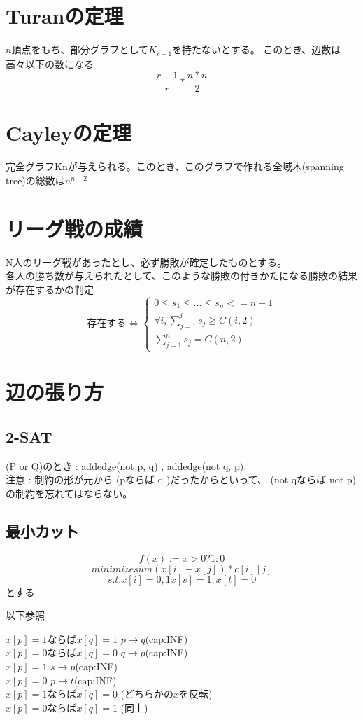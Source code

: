 \section{Turanの定理}
$n$頂点をもち、部分グラフとして$K_{r+1}$を持たないとする。
このとき、辺数は高々以下の数になる
\[\frac{r-1}{r} * \frac{n*n}{2}\]

\section{Cayleyの定理}
完全グラフKnが与えられる。このとき、このグラフで作れる全域木(spanning tree)の総数は$n^{n-2}$\\

\section{リーグ戦の成績}
N人のリーグ戦があったとし、必ず勝敗が確定したものとする。\\
各人の勝ち数が与えられたとして、このような勝敗の付きかたになる勝敗の結果が存在するかの判定\\

\[存在する \Leftrightarrow \begin{cases}
0 \leq s_1 \leq ... \leq s_n <= n-1 \\
\forall i, \sum_{j=1}^{i} s_j \geq C(i,2) \\
\sum_{j=1}^{n} s_j = C(n,2)
\end{cases} \]


\section{辺の張り方}

\subsection{2-SAT}
(P or Q)のとき : addedge(not p, q) , addedge(not q, p); \\

注意 : 制約の形が元から (pならば q )だったからといって、
(not qならば not p)の制約を忘れてはならない。


\subsection{最小カット}
\[f(x) := x>0 ? 1 : 0\]
\[minimize sum(x[i] - x[j]) * c[i][j]\]
\[s.t. x[i]=0,1 x[s]=1, x[t]=0\]
とする

以下参照

$x[p]=1$ならば$x[q]=1$  $p \rightarrow q$(cap:INF)\\
$x[p]=0$ならば$x[q]=0$	$q \rightarrow p$(cap:INF)\\
$x[p]=1$ $s \rightarrow p$(cap:INF)\\
$x[p]=0$ $p \rightarrow t$(cap:INF)\\
$x[p]=1$ならば$x[q]=0$	(どちらかの$x$を反転)\\
$x[p]=0$ならば$x[q]=1$	(同上)\\

